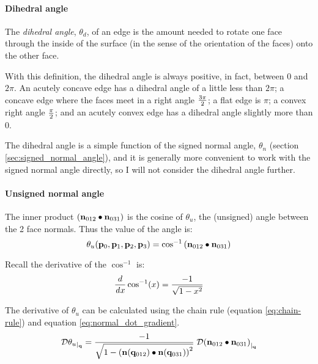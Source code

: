 
\paragraph{Dihedral angle}
\label{sec:Dihedral-angle}

The {\it dihedral angle},
$\theta_d$,
 of an edge is the amount
needed to rotate one face
through the inside of the surface
(in the sense of the orientation of the faces)
onto the other face.

With this definition, the dihedral angle is always
positive, in fact, between $0$ and $2\pi$.
An acutely concave edge has a dihedral angle
of a little less than $2\pi$;
a concave edge where the faces meet in a right angle
${3\pi} \over 2$;
a flat edge is $\pi$;
a convex right angle $\pi \over 2$;
and an acutely convex edge has a dihedral angle
slightly more than $0$.

The dihedral angle is a simple function of the
signed normal angle, $\theta_n$
(section \ref{sec:signed_normal_angle}),
and it is generally more convenient to work
with the signed normal angle directly,
so I will not consider the dihedral angle further.


\paragraph{Unsigned normal angle}
\label{sec:unsigned_normal_angle}

The inner product $\left( {\mathbf n}_{012} \bullet {\mathbf n}_{031} \right)$
is the cosine of $\theta_u$,
the (unsigned) angle between the 2 face normals.
Thus the value of the angle is:
\begin{equation}
\theta_u({\mathbf p}_0,{\mathbf p}_1,{\mathbf p}_2,{\mathbf p}_3)
= \cos^{-1} \left( {\mathbf n}_{012} \bullet {\mathbf n}_{031} \right)
\end{equation}

Recall the derivative of the $\cos^{-1}$ is:
\begin{equation}
\frac{d}{\mathit dx} \cos^{-1}(x) = { -1 \over \sqrt{1 - x^2} }
\end{equation}

The derivative of $\theta_u$ can be calculated using the chain rule
(equation \ref{eq:chain-rule}) and equation \ref{eq:normal_dot_gradient}.
\begin{equation}
{\mathcal{D}{\theta_u}_{\mid_{{\mathbf q}}}}
 = { -1 \over \sqrt{1 - \left( {\mathbf n}({\mathbf q}_{012}) \bullet {\mathbf n}({\mathbf q}_{031}) \right)^2} }
\; {\mathcal{D}{\left( {\mathbf n}_{012} \bullet {\mathbf n}_{031} \right)}_{\mid_{{\mathbf q}}}}
\end{equation}

